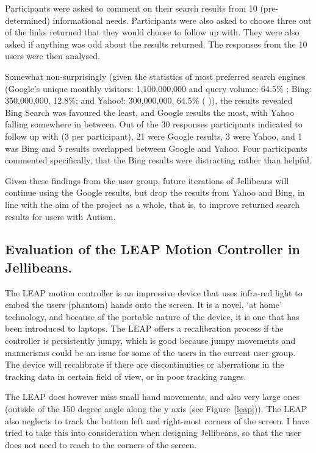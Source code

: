 \documentclass[a4paper, 11pt]{article}
\begin{document}
\vspace{5mm}
Participants were asked to comment on their search results from 10 (pre-determined) informational needs. Participants were also asked to choose three out of the links returned that they would choose to follow up with. They were also asked if anything was odd about the results returned. The responses from the 10 users were then analysed. 

\vspace{5mm}
Somewhat non-surprisingly (given the statistics of most preferred search engines (Google's unique monthly visitors: 1,100,000,000 and query
volume: 64.5\% ; Bing: 350,000,000, 12.8\%; and Yahoo!: 300,000,000, 64.5\% (\cite{ebiz} \cite{adam})), the results revealed Bing Search was favoured the least, and Google results the most, with Yahoo falling somewhere in between. Out of the 30 responses participants indicated to follow up with (3 per participant), 21 were Google results, 3 were Yahoo, and 1 was Bing and 5 results overlapped between Google and Yahoo. Four participants commented specifically, that the Bing results were distracting rather than helpful.

\vspace{5mm}
Given these findings from the user group, future iterations of Jellibeans will continue using the Google results, but drop the results from Yahoo and Bing, in line with the aim of the project as a whole, that is, to improve returned search results for users with Autism.

\subsection {Evaluation of the LEAP Motion Controller in Jellibeans.}
The LEAP motion controller is an impressive device that uses infra-red light to embed the users (phantom) hands onto the screen. It is a novel, `at home' technology, and because of the portable nature of the device, it is one that has been introduced to laptops. The LEAP offers a recalibration process if the controller is persistently jumpy, which is good because jumpy movements and mannerisms could be an issue for some of the users in the current user group. The device will recalibrate if there are discontinuities or aberrations in the tracking data in certain field of view, or in poor tracking ranges. 

\vspace{5mm}
The LEAP does however miss small hand movements, and also very large ones (outside of the 150 degree angle along the y axis (see Figure~\ref{leap})). The LEAP also neglects to track the bottom left and right-most corners of the screen. I have tried to take this into consideration when designing Jellibeans, so that the user does not need to reach to the corners of the screen.
\end{document}
